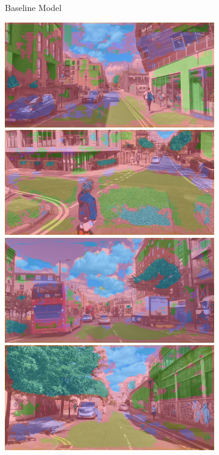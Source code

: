 \begin{figure}[H]
\begin{subfigure}[t]{.32\textwidth}
		\caption{Baseline Model}
	\end{subfigure}
	\hfill{}\begin{subfigure}[t]{.32\textwidth}
		\includegraphics[width=\textwidth]{city_images/HackneyScapes/Hackney3159_unet.png} \\[5pt]
		\includegraphics[width=\textwidth]{city_images/HackneyScapes/Hackney3171_unet.png} \\[5pt]
		\includegraphics[width=\textwidth]{city_images/HackneyScapes/Hackney3200_unet.png} \\[5pt]
		\includegraphics[width=\textwidth]{city_images/HackneyScapes/Hackney3164_unet.png} \\[5pt]

\end{subfigure}
\end{figure}

